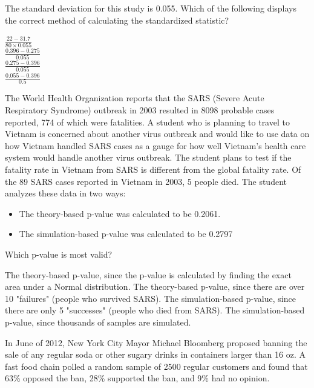 \documentclass{article}
\begin{document}
\begin{mcquestions}
	\question[follow] The standard deviation for this study is 0.055. Which of the following displays the correct method of calculating the standardized statistic?
	
	\begin{mcanswerslist}
		\answer \(\frac{22-31.7}{80\times0.055}\)\\[0.1cm]
		\answer \(\frac{0.396-0.275}{0.055}\)\\[0.1cm]
		\answer[correct] \(\frac{0.275-0.396}{0.055}\)\\[0.1cm]
		\answer \(\frac{0.055-0.396}{0.5}\)\\[0.1cm]
	\end{mcanswerslist}
	
	\question The World Health Organization reports that the SARS (Severe Acute Respiratory Syndrome) outbreak in 2003 resulted in 8098 probable cases reported, 774 of which were fatalities. A student who is planning to travel to Vietnam is concerned about another virus outbreak and would like to use data on how Vietnam handled SARS cases as a gauge for how well Vietnam's health care system would handle another virus outbreak. The student plans to test if the fatality rate in Vietnam from SARS is different from the global fatality rate. Of the 89 SARS cases reported in Vietnam in 2003, 5 people died. The student analyzes these data in two ways:
	\begin{itemize}
		\item[Method 1:]  The theory-based p-value was calculated to be 0.2061.
		\item[Method 2:]  The simulation-based p-value was calculated to be 0.2797
	\end{itemize}
	Which p-value is most valid?
	
	\begin{mcanswerslist}
		\answer The theory-based p-value, since the p-value is calculated by finding the exact area under a Normal distribution.
		\answer The theory-based p-value, since there are over 10 "failures" (people who survived SARS).
		\answer[correct] The simulation-based p-value, since there are only 5 "successes" (people who died from SARS).
		\answer The simulation-based p-value, since thousands of samples are simulated.
	\end{mcanswerslist}
	
	\begin{mcquestioninstruction}
		In June of 2012, New York City Mayor Michael Bloomberg proposed banning the sale of any regular soda or other sugary drinks in containers larger than 16 oz. A fast food chain polled a random sample of 2500 regular customers and found that 63\% opposed the ban, 28\% supported the ban, and 9\% had no opinion.
	\end{mcquestioninstruction}
	

\end{mcquestions}
\end{document}
